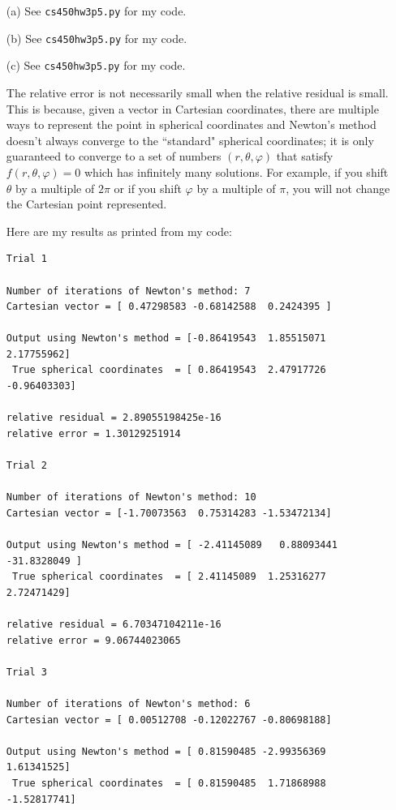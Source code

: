 \documentclass[10pt]{article}
\begin{document}

\begin{enumerate}

\item[(a)] See \verb+cs450hw3p5.py+ for my code.

\item[(b)] See \verb+cs450hw3p5.py+ for my code.

\item[(c)] See \verb+cs450hw3p5.py+ for my code. 

The relative error is not necessarily small when the relative residual is small. This is because, given a vector in Cartesian coordinates, there are multiple ways to represent the point in spherical coordinates and Newton's method doesn't always converge to the ``standard" spherical coordinates; it is only guaranteed to converge to a set of numbers $ (r, \theta, \varphi) $ that satisfy $ f(r, \theta, \varphi) = 0 $ which has infinitely many solutions. For example, if you shift $\theta$ by a multiple of $2 \pi$ or if you shift $ \varphi $ by a multiple of $\pi$, you will not change the Cartesian point represented. 

Here are my results as printed from my code:

\begin{verbatim}
Trial 1

Number of iterations of Newton's method: 7
Cartesian vector = [ 0.47298583 -0.68142588  0.2424395 ]

Output using Newton's method = [-0.86419543  1.85515071  2.17755962]
 True spherical coordinates  = [ 0.86419543  2.47917726 -0.96403303]

relative residual = 2.89055198425e-16
relative error = 1.30129251914

Trial 2

Number of iterations of Newton's method: 10
Cartesian vector = [-1.70073563  0.75314283 -1.53472134]

Output using Newton's method = [ -2.41145089   0.88093441 -31.8328049 ]
 True spherical coordinates  = [ 2.41145089  1.25316277  2.72471429]

relative residual = 6.70347104211e-16
relative error = 9.06744023065

Trial 3

Number of iterations of Newton's method: 6
Cartesian vector = [ 0.00512708 -0.12022767 -0.80698188]

Output using Newton's method = [ 0.81590485 -2.99356369  1.61341525]
 True spherical coordinates  = [ 0.81590485  1.71868988 -1.52817741]


\end{verbatim}
\end{enumerate}
\end{document}
